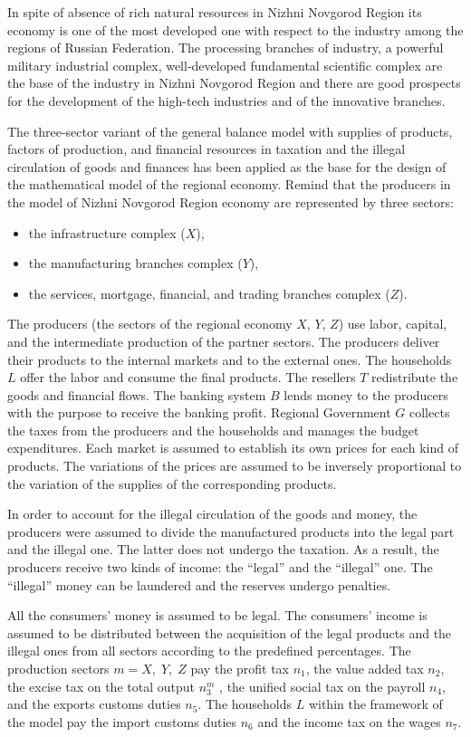 In spite of absence of rich natural resources in Nizhni Novgorod Region its economy is one of the most developed one with respect to the industry among the regions of Russian Federation. The processing branches of industry, a powerful military industrial complex, well-developed fundamental scientific complex are the base of the industry in Nizhni Novgorod Region and there are good prospects for the development of the high-tech industries and of the innovative branches.

The three-sector variant of the general balance model with supplies of products, factors of production, and financial resources in taxation and the illegal circulation of goods and finances \cite{8_Olenev2007} has been applied as the base for the design of the mathematical model of the regional economy. Remind that the producers in the model of Nizhni Novgorod Region economy are represented by three sectors: 
\begin{itemize}
	\item the infrastructure complex ($X$),
	\item the manufacturing branches complex ($Y$),
	\item the services, mortgage, financial, and trading branches complex ($Z$).
\end{itemize}
The producers (the sectors of the regional economy $X$, $Y$, $Z$) use labor, capital, and the intermediate production of the partner sectors. The producers deliver their products to the internal markets and to the external ones. The households $L$ offer the labor and consume the final products. The resellers $T$ redistribute the goods and financial flows. The banking system $B$ lends money to the producers with the purpose to receive the banking profit. Regional Government $G$ collects the taxes from the producers and the households and manages the budget expenditures. Each market is assumed to establish its own prices for each kind of products. The variations of the prices are assumed to be inversely proportional to the variation of the supplies of the corresponding products. 

In order to account for the illegal circulation of the goods and money, the producers were assumed to divide the manufactured products into the legal part and the illegal one. The latter does not undergo the taxation. As a result, the producers receive two kinds of income: the ``legal'' and the ``illegal'' one. The ``illegal'' money can be laundered and the reserves undergo penalties.

All the consumers’ money is assumed to be legal. The consumers’ income is assumed to be distributed between the acquisition of the legal products and the illegal ones from all sectors according to the predefined percentages. The production sectors $m = X,\;Y,\;Z$ pay the profit tax $n_1$, the value added tax $n_2$, the excise tax on the total output $n_3^m$ , the unified social tax on the payroll $n_4$, and the exports customs duties $n_5$. The households $L$ within the framework of the model pay the import customs duties $n_6$ and the income tax on the wages $n_7$.

